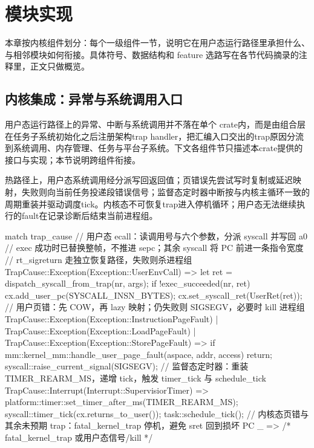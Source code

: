 
\chapter{模块实现}

本章按内核组件划分：每个一级组件一节，说明它在用户态运行路径里承担什么、与相邻模块如何衔接。具体符号、数据结构和 feature 选路写在各节代码摘录的注释里，正文只做概览。

\section{内核集成：异常与系统调用入口}

用户态运行路径上的异常、中断与系统调用并不落在单个 crate内，而是由组合层在任务子系统初始化之后注册架构trap handler，把汇编入口交出的trap原因分流到系统调用、内存管理、任务与平台子系统。下文各组件节只描述本crate提供的接口与实现；本节说明跨组件衔接。

热路径上，用户态系统调用经分派写回返回值；页错误先尝试写时复制或延迟映射，失败则向当前任务投递段错误信号；监督态定时器中断按与内核主循环一致的周期重装并驱动调度tick。内核态不可恢复trap进入停机循环；用户态无法继续执行的fault在记录诊断后结束当前进程组。

\begin{rustcode}
match trap_cause {
    // 用户态 ecall：读调用号与六个参数，分派 syscall 并写回 a0
    // exec 成功时已替换整帧，不推进 sepc；其余 syscall 将 PC 前进一条指令宽度
    // rt_sigreturn 走独立恢复路径，失败则杀进程组
    TrapCause::Exception(Exception::UserEnvCall) => {
        let ret = dispatch_syscall_from_trap(nr, args);
        if !exec_succeeded(nr, ret) {
            cx.add_user_pc(SYSCALL_INSN_BYTES);
            cx.set_syscall_ret(UserRet(ret));
        }
    }
    // 用户页错：先 COW，再 lazy 映射；仍失败则 SIGSEGV，必要时 kill 进程组
    TrapCause::Exception(Exception::InstructionPageFault)
    | TrapCause::Exception(Exception::LoadPageFault)
    | TrapCause::Exception(Exception::StorePageFault) => {
        if mm::kernel_mm::handle_user_page_fault(aspace, addr, access) {
            return;
        }
        syscall::raise_current_signal(SIGSEGV);
    }
    // 监督态定时器：重装 TIMER_REARM_MS，递增 tick，触发 timer_tick 与 schedule_tick
    TrapCause::Interrupt(Interrupt::SupervisiorTimer) => {
        platform::timer::set_timer_after_ms(TIMER_REARM_MS);
        syscall::timer_tick(cx.returns_to_user());
        task::schedule_tick();
    }
    // 内核态页错与其余未预期 trap：fatal_kernel_trap 停机，避免 sret 回到损坏 PC
    _ => { /* fatal_kernel_trap 或用户态信号/kill */ }
}
\end{rustcode}

